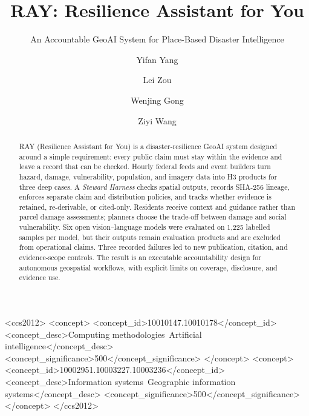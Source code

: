 \documentclass[sigconf,screen]{acmart}
\begin{document}
\title{RAY: Resilience Assistant for You}
\subtitle{An Accountable GeoAI System for Place-Based Disaster Intelligence}

\author{Yifan Yang}

\author{Lei Zou}

\author{Wenjing Gong}

\author{Ziyi Wang}

\begin{abstract}
RAY (Resilience Assistant for You) is a disaster-resilience GeoAI system
designed around a simple requirement: every public claim must stay within
the evidence and leave a record that can be checked. Hourly federal feeds
and event builders turn hazard, damage, vulnerability, population, and
imagery data into H3 products for three deep cases. A \emph{Steward Harness}
checks spatial outputs, records SHA-256 lineage, enforces separate claim and
distribution policies, and tracks whether evidence is retained,
re-derivable, or cited-only. Residents receive context and guidance rather
than parcel damage assessments; planners choose the trade-off between damage
and social vulnerability. Six open vision--language models were evaluated on
1{,}225 labelled samples per model, but their outputs remain evaluation
products and are excluded from operational claims. Three recorded failures
led to new publication, citation, and evidence-scope controls. The result is
an executable accountability design for autonomous geospatial workflows,
with explicit limits on coverage, disclosure, and evidence use.
\end{abstract}

\begin{CCSXML}
<ccs2012>
<concept>
<concept_id>10010147.10010178</concept_id>
<concept_desc>Computing methodologies~Artificial intelligence</concept_desc>
<concept_significance>500</concept_significance>
</concept>
<concept>
<concept_id>10002951.10003227.10003236</concept_id>
<concept_desc>Information systems~Geographic information systems</concept_desc>
<concept_significance>500</concept_significance>
</concept>
</ccs2012>
\end{CCSXML}
\end{document}
